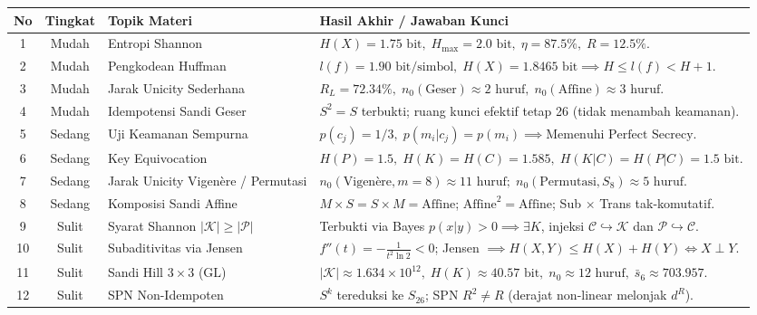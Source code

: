 \documentclass[11pt,a4paper]{article}
\begin{document}
\begin{table}[H]
\centering
\small
\renewcommand{\arraystretch}{1.5}
\begin{tabular}{c c p{4.2cm} p{8.8cm}}
\toprule
\textbf{No} & \textbf{Tingkat} & \textbf{Topik Materi} & \textbf{Hasil Akhir / Jawaban Kunci} \\
\midrule
1 & Mudah & Entropi Shannon & $H(X) = 1.75\text{ bit}, \; H_{\max} = 2.0\text{ bit}, \; \eta = 87.5\%, \; R = 12.5\%$. \\
2 & Mudah & Pengkodean Huffman & $l(f) = 1.90\text{ bit/simbol}, \; H(X) = 1.8465\text{ bit} \implies H \le l(f) < H+1$. \\
3 & Mudah & Jarak Unicity Sederhana & $R_L = 72.34\%, \; n_0(\text{Geser}) \approx 2\text{ huruf}, \; n_0(\text{Affine}) \approx 3\text{ huruf}$. \\
4 & Mudah & Idempotensi Sandi Geser & $S^2 = S$ terbukti; ruang kunci efektif tetap 26 (tidak menambah keamanan). \\
\midrule
5 & Sedang & Uji Keamanan Sempurna & $p(c_j) = 1/3, \; p(m_i|c_j) = p(m_i) \implies \text{Memenuhi Perfect Secrecy}$. \\
6 & Sedang & Key Equivocation & $H(P) = 1.5, \; H(K) = H(C) = 1.585, \; H(K|C) = H(P|C) = 1.5\text{ bit}$. \\
7 & Sedang & Jarak Unicity Vigenère / Permutasi & $n_0(\text{Vigenère}, m=8) \approx 11\text{ huruf}; \; n_0(\text{Permutasi}, S_8) \approx 5\text{ huruf}$. \\
8 & Sedang & Komposisi Sandi Affine & $M \times S = S \times M = \text{Affine}$; $\text{Affine}^2 = \text{Affine}$; Sub $\times$ Trans tak-komutatif. \\
\midrule
9 & Sulit & Syarat Shannon $|\mathcal{K}| \ge |\mathcal{P}|$ & Terbukti via Bayes $p(x|y)>0 \implies \exists K$, injeksi $\mathcal{C} \hookrightarrow \mathcal{K}$ dan $\mathcal{P} \hookrightarrow \mathcal{C}$. \\
10 & Sulit & Subaditivitas via Jensen & $f''(t) = -\frac{1}{t^2\ln 2} < 0$; Jensen $\implies H(X,Y) \le H(X)+H(Y) \iff X \perp Y$. \\
11 & Sulit & Sandi Hill $3 \times 3$ ($\mathrm{GL}$) & $|\mathcal{K}| \approx 1.634 \times 10^{12}, \; H(K) \approx 40.57\text{ bit}, \; n_0 \approx 12\text{ huruf}, \; \bar{s}_6 \approx 703.957$. \\
12 & Sulit & SPN Non-Idempoten & $S^k$ tereduksi ke $S_{26}$; SPN $R^2 \neq R$ (derajat non-linear melonjak $d^R$). \\
\bottomrule
\end{tabular}
\end{table}
\end{document}

